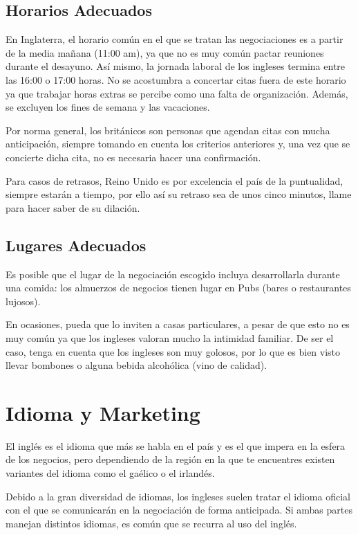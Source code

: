 \documentclass[letterpaper, 12pt]{article}
\begin{document}
\subsection*{Horarios Adecuados}

En Inglaterra, el horario común en el que se tratan las negociaciones es a
partir de la media mañana (11:00 am), ya que no es muy común pactar reuniones
durante el desayuno. Así mismo, la jornada laboral de los ingleses termina
entre las 16:00 o 17:00 horas. No se acostumbra a concertar citas fuera de este
horario ya que trabajar horas extras se percibe como una falta de organización.
Además, se excluyen los fines de semana y las vacaciones.

Por norma general, los británicos son personas que agendan citas con mucha
anticipación, siempre tomando en cuenta los criterios anteriores y, una vez que
se concierte dicha cita, no es necesaria hacer una confirmación.

Para casos de retrasos, Reino Unido es por excelencia el país de la
puntualidad, siempre estarán a tiempo, por ello así su retraso sea de unos
cinco minutos, llame para hacer saber de su dilación.

\subsection*{Lugares Adecuados}

Es posible que el lugar de la negociación escogido incluya desarrollarla
durante una comida: los almuerzos de negocios tienen lugar en Pubs (bares o
restaurantes lujosos).

En ocasiones, pueda que lo inviten a casas particulares, a pesar de que esto no
es muy común ya que los ingleses valoran mucho la intimidad familiar. De ser el
caso, tenga en cuenta que los ingleses son muy golosos, por lo que es bien
visto llevar bombones o alguna bebida alcohólica (vino de calidad).

\section*{Idioma y Marketing}

El inglés es el idioma que más se habla en el país y es el que impera en la
esfera de los negocios, pero dependiendo de la región en la que te encuentres
existen variantes del idioma como el gaélico o el irlandés.

Debido a la gran diversidad de idiomas, los ingleses suelen tratar el idioma
oficial con el que se comunicarán en la negociación de forma anticipada. Si
ambas partes manejan distintos idiomas, es común que se recurra al uso del
inglés.
\end{document}
